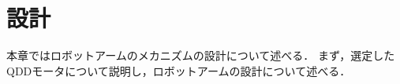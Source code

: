 \chapter{設計}
\label{chap:third}
%
本章ではロボットアームのメカニズムの設計について述べる．
まず，選定したQDDモータについて説明し，ロボットアームの設計について述べる．





%